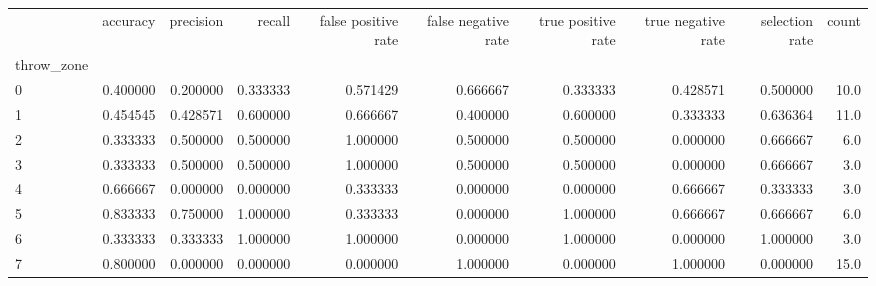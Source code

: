 \begin{tabular}{lrrrrrrrrr}
\toprule
{} &  accuracy &  precision &    recall &  false positive rate &  false negative rate &  true positive rate &  true negative rate &  selection rate &  count \\
throw\_zone &           &            &           &                      &                      &                     &                     &                 &        \\
\midrule
0          &  0.400000 &   0.200000 &  0.333333 &             0.571429 &             0.666667 &            0.333333 &            0.428571 &        0.500000 &   10.0 \\
1          &  0.454545 &   0.428571 &  0.600000 &             0.666667 &             0.400000 &            0.600000 &            0.333333 &        0.636364 &   11.0 \\
2          &  0.333333 &   0.500000 &  0.500000 &             1.000000 &             0.500000 &            0.500000 &            0.000000 &        0.666667 &    6.0 \\
3          &  0.333333 &   0.500000 &  0.500000 &             1.000000 &             0.500000 &            0.500000 &            0.000000 &        0.666667 &    3.0 \\
4          &  0.666667 &   0.000000 &  0.000000 &             0.333333 &             0.000000 &            0.000000 &            0.666667 &        0.333333 &    3.0 \\
5          &  0.833333 &   0.750000 &  1.000000 &             0.333333 &             0.000000 &            1.000000 &            0.666667 &        0.666667 &    6.0 \\
6          &  0.333333 &   0.333333 &  1.000000 &             1.000000 &             0.000000 &            1.000000 &            0.000000 &        1.000000 &    3.0 \\
7          &  0.800000 &   0.000000 &  0.000000 &             0.000000 &             1.000000 &            0.000000 &            1.000000 &        0.000000 &   15.0 \\
\bottomrule
\end{tabular}
